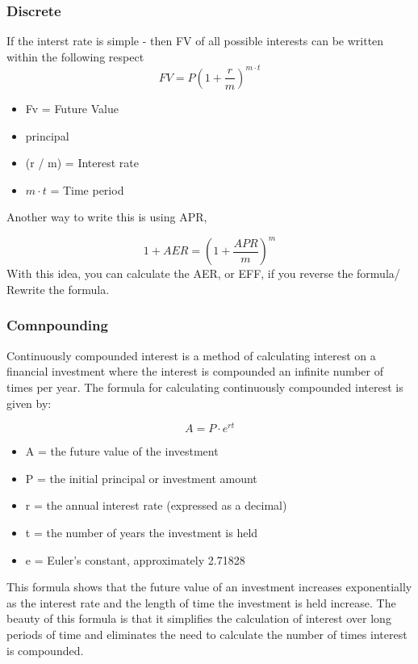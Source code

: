 \documentclass{article}
\theoremstyle{mytheoremstyle}
\theoremstyle{mytheoremstyle}
\theoremstyle{myproblemstyle}
\begin{document}
\subsubsection{Discrete}
If the interst rate is simple - then FV of all possible interests can be written within the following respect
$$
	FV = P(1+ \frac{r}{m})^{m \cdot t}
$$

\begin{itemize}
	\item Fv = Future Value
	\item principal
	\item (r / m) = Interest rate
	\item $ m \cdot t $ = Time period
\end{itemize}


Another way to write this is using APR,

$$
	1 + AER = (1 + \frac{APR}{m})^{m}
$$
With this idea, you can calculate the AER, or EFF, if you reverse the formula/ Rewrite the formula.

\subsubsection{Comnpounding}
Continuously compounded interest is a method of calculating interest on a financial investment where the interest is compounded an infinite number of times per year. The formula for calculating continuously compounded interest is given by:

$$
	A = P \cdot e^{rt}
$$

\begin{itemize}
	\item A = the future value of the investment
	\item P = the initial principal or investment amount
	\item r = the annual interest rate (expressed as a decimal)
	\item t = the number of years the investment is held
	\item e = Euler's constant, approximately 2.71828
\end{itemize}
This formula shows that the future value of an investment increases exponentially as the interest rate and the length of time the investment is held increase. The beauty of this formula is that it simplifies the calculation of interest over long periods of time and eliminates the need to calculate the number of times interest is compounded.
\end{document}
